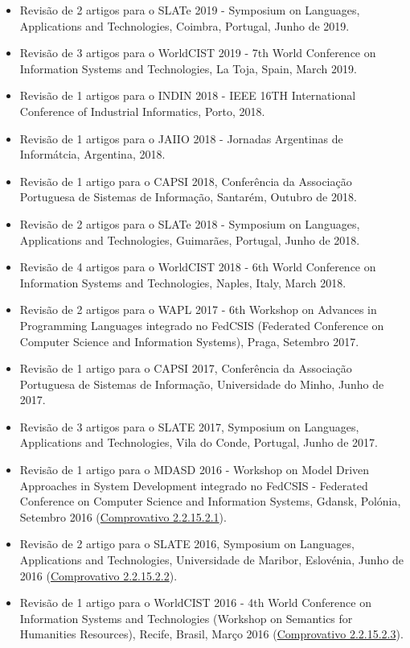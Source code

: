 \documentclass[11pt]{article}
\begin{document}
\begin{itemize}
\item {Revisão de 2 artigos para o SLATe 2019 - Symposium on Languages, Applications and Technologies, Coimbra, Portugal, Junho de 2019.}
\item {Revisão de 3 artigos para o WorldCIST 2019 - 7th World Conference on Information Systems and Technologies, La Toja, Spain, March 2019.}
\item {Revisão de 1 artigos para o INDIN 2018 - IEEE 16TH International Conference of Industrial Informatics, Porto, 2018.}
\item {Revisão de 1 artigos para o JAIIO 2018 - Jornadas Argentinas de Informátcia, Argentina, 2018.}
\item {Revisão de 1 artigo para o CAPSI 2018, Conferência da Associação Portuguesa de Sistemas de Informação, Santarém, Outubro de 2018.}
\item {Revisão de 2 artigos para o SLATe 2018 - Symposium on Languages, Applications and Technologies, Guimarães, Portugal, Junho de 2018.}
\item {Revisão de 4 artigos para o WorldCIST 2018 - 6th World Conference on Information Systems and Technologies, Naples, Italy, March 2018.}
\item {Revisão de 2 artigos para o WAPL 2017 - 6th Workshop on Advances in Programming Languages integrado no FedCSIS (Federated Conference on Computer Science and Information Systems), Praga, Setembro 2017.}
\item {Revisão de 1 artigo para o CAPSI 2017, Conferência da Associação Portuguesa de Sistemas de Informação, Universidade do Minho, Junho de 2017.}
\item {Revisão de 3 artigos para o SLATE 2017, Symposium on Languages, Applications and Technologies, Vila do Conde, Portugal, Junho de 2017.}
\item {Revisão de 1 artigo para o MDASD 2016 - Workshop on Model Driven Approaches in System Development integrado no FedCSIS - Federated Conference on Computer Science and Information Systems, Gdansk, Polónia, Setembro 2016 (\href{run:ComprovativosCOCP/revisoes/MDASD2016.pdf}{Comprovativo 2.2.15.2.1}). }
\item {Revisão de 2 artigo para o SLATE 2016, Symposium on Languages, Applications and Technologies, Universidade de Maribor, Eslovénia, Junho de 2016 (\href{run:ComprovativosCOCP/revisoes/SLATE2016.pdf}{Comprovativo 2.2.15.2.2}). }
\item {Revisão de 1 artigo para o WorldCIST 2016 - 4th World Conference on Information Systems and Technologies (Workshop on Semantics for Humanities Resources), Recife, Brasil, Março 2016 (\href{run:ComprovativosCOCP/revisoes/WorldCisT2016.pdf}{Comprovativo 2.2.15.2.3}).}

\end{itemize}
\end{document}
